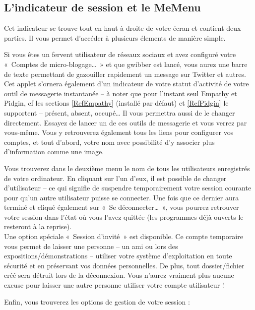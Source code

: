 \subsection{L'indicateur de session et le MeMenu}
\label{RefSwitchUser}
Cet indicateur se trouve tout en haut à droite de votre écran et contient deux parties. Il vous permet d'accéder à plusieurs élements de manière simple.\par
Si vous êtes un fervent utilisateur de réseaux sociaux et avez configuré votre «~Comptes de micro-blogage\ldots{}~» et que gwibber est lancé, vous aurez une barre de texte permettant de gazouiller rapidement un message sur Twitter et autres.\\
Cet applet s'ornera également d'un indicateur de votre statut d'activité de votre outil de messagerie instantanée -- à noter que pour l'instant seul Empathy et Pidgin, cf les sections \ref{RefEmpathy} (installé par défaut) et \ref{RefPidgin} le supportent -- présent, absent, occupé\ldots{} Il vous permettra aussi de le changer directement. Essayez de lancer un de ces outils de messagerie et vous verrez par vous-même. Vous y retrouverez également tous les liens pour configurer vos comptes, et tout d'abord, votre nom avec possibilité d'y associer plus d'information comme une image.\par
Vous trouverez dans le deuxième menu le nom de tous les utilisateurs enregistrés de votre ordinateur. En cliquant sur l'un d'eux, il est possible de changer d'utilisateur -- ce qui signifie de suspendre temporairement votre session courante pour qu'un autre utilisateur puisse se connecter. Une fois que ce dernier aura terminé et cliqué également sur «~Se déconnecter\ldots{}~», vous pourrez retrouver votre session dans l'état où vous l'avez quittée (les programmes déjà ouverts le resteront à la reprise).\\
Une option spéciale «~Session d'invité~» est disponible. Ce compte temporaire vous permet de laisser une personne -- un ami ou lors des expositions/\IndicCesure{}démonstrations -- utiliser votre système d'exploitation en toute sécurité et en préservant vos données personnelles. De plus, tout dossier/fichier créé sera détruit lors de la déconnexion. Vous n'aurez vraiment plus aucune excuse pour laisser une autre personne utiliser votre compte utilisateur !\par
Enfin, vous trouverez les options de gestion de votre session :
